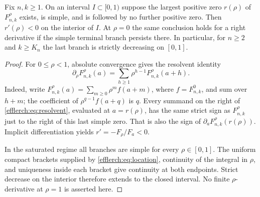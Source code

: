\begin{proposition}
\label{efflerch:prop:terminal}
Fix $n,k\geq1$.  On an interval $I\subset[0,1)$ suppose the largest
positive zero $r(\rho)$ of $F_{n,k}^\rho$ exists, is simple, and is
followed by no further positive zero.  Then $r'(\rho)<0$ on the interior
of $I$.  At $\rho=0$ the same conclusion holds for a right derivative
if the simple terminal branch persists there.  In particular, for
$n\geq2$ and $k\geq K_n$ the last branch is strictly decreasing on $[0,1]$.
\end{proposition}
\begin{proof}
For $0\leq\rho<1$, absolute convergence gives the resolvent identity
\begin{equation}\label{efflerch:eq:resolvent}
 \partial_\rho F_{n,k}^\rho(a)
  =\sum_{h\geq1}\rho^{h-1}F_{n,k}^\rho(a+h).
\end{equation}
Indeed, write $F_{n,k}^\rho(a)=\sum_{m\geq0}\rho^m f(a+m)$,
where $f=F_{n,k}^0$, and sum over $h+m$; the coefficient of
$\rho^{q-1}f(a+q)$ is $q$.  Every summand on the right of
\eqref{efflerch:eq:resolvent}, evaluated at $a=r(\rho)$, has the
same strict sign as $F_{n,k}^\rho$ just to the right of this last
simple zero.  That is also the sign of $\partial_aF_{n,k}^\rho(r(\rho))$.
Implicit differentiation yields $r'=-F_\rho/F_a<0$.

In the saturated regime all branches are simple for every
$\rho\in[0,1]$.  The uniform compact brackets supplied by
\eqref{efflerch:eq:location}, continuity of the integral in $\rho$,
and uniqueness inside each bracket give continuity at both endpoints.
Strict decrease on the interior therefore extends to the closed interval.
No finite $\rho$-derivative at $\rho=1$ is asserted here.
\end{proof}

